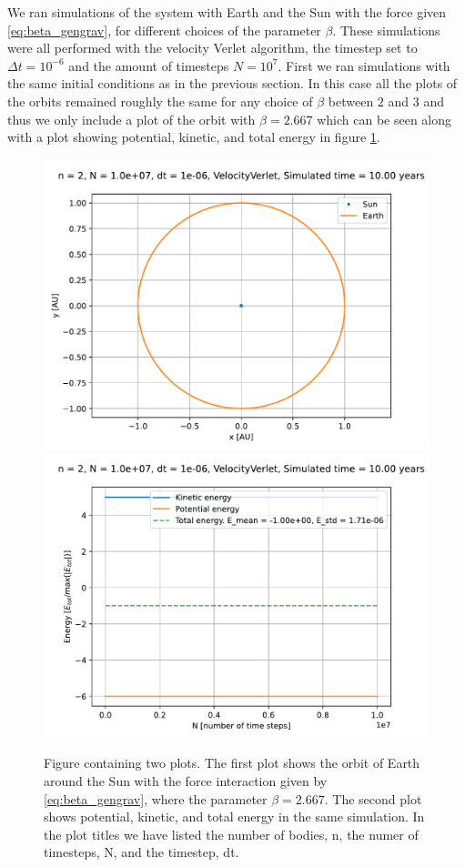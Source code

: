 \documentclass[reprint,english,notitlepage]{revtex4-1}  %
\begin{document}
We ran simulations of the system with Earth and the Sun with the force given \eqref{eq:beta_gengrav}, for different choices of the parameter $\beta$. These simulations were all performed with the velocity Verlet algorithm, the timestep set to $\Delta t = 10^{-6}$ and the amount of timesteps $N = 10^7$. First we ran simulations with the same initial conditions as in the previous section. In this case all the plots of the orbits remained roughly the same for any choice of $\beta$ between $2$ and $3$ and thus we only include a plot of the orbit with $\beta=2.667$ which can be seen along with a plot showing potential, kinetic, and total energy in figure \ref{fig:beta-se-orbit-energy}.


\begin{figure}[H]
\includegraphics[width=\columnwidth]{../data/figures/varyingbeta/se_beta2667_vv_orbits2D.pdf}
\includegraphics[width=\columnwidth]{../data/figures/varyingbeta/se_beta2667_vv_energy.pdf}
\caption{Figure containing two plots. The first plot shows the orbit of Earth around the Sun with the force interaction given by \eqref{eq:beta_gengrav}, where the parameter $\beta = 2.667$. The second plot shows potential, kinetic, and total energy in the same simulation. In the plot titles we have listed the number of bodies, n, the numer of timesteps, N, and the timestep, dt.}
\label{fig:beta-se-orbit-energy}
\end{figure}
\end{document}
